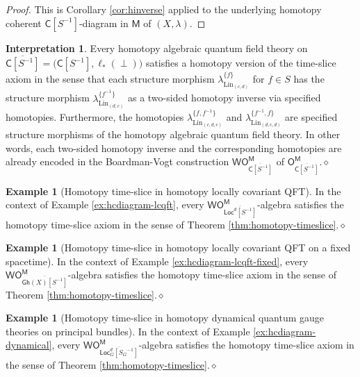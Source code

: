 \documentclass[11pt]{amsbook}
\numberwithin{section}{chapter}
\numberwithin{subsection}{section}
\numberwithin{equation}{section}
\theoremstyle{plain}
\theoremstyle{definition}
\newtheorem{example}[equation]{Example}
\newtheorem{interpretation}[equation]{Interpretation}
\newcommand{\Lin}{\mathrm{Lin}}
\newcommand{\C}{\mathsf{C}}
\newcommand{\M}{\mathsf{M}}
\renewcommand{\O}{\mathsf{O}}
\newcommand{\Otom}{\O^{\M}}
\newcommand{\W}{\mathsf{W}}
\newcommand{\dqed}{\hfill$\diamond$}
\newcommand{\inv}[1]{{#1}^{-1}}
\newcommand{\finverse}{\inv{f}}
\newcommand{\Sinv}{\inv{S}}
\newcommand{\Csinv}{\C[\inv{S}]}
\newcommand{\Csinvbar}{\overline{\Csinv}}
\newcommand{\Ocsinvbar}{\O_{\Csinvbar}}
\newcommand{\Ocsinvbarm}{\Ocsinvbar^{\M}}
\newcommand{\Bgloc}{\Locd_G}
\newcommand{\Bglocsginv}{\Bgloc[\inv{S_G}]}
\newcommand{\Bglocsginvbar}{\overline{\Bglocsginv}}
\newcommand{\Gh}{\mathsf{Gh}}
\newcommand{\Ghx}{\Gh(X)}
\newcommand{\Ghxsinvbar}{\overline{\Ghx[\Sinv]}}
\newcommand{\Loc}{\mathsf{Loc}}
\newcommand{\Locd}{\Loc^d}
\newcommand{\Locdsinv}{\Locd[\Sinv]}
\newcommand{\Locdsinvbar}{\overline{\Locdsinv}}
\newcommand{\wom}{\W\Otom}
\newcommand{\wocsinvbarm}{\W\Ocsinvbarm}
\begin{document}
\begin{proof}
This is Corollary \ref{cor:hinverse} applied to the underlying homotopy coherent $\Csinv$-diagram in $\M$ of $(X,\lambda)$.
\end{proof}

\begin{interpretation}
Every homotopy algebraic quantum field theory on $\Csinvbar=\bigl(\Csinv, \ell_*(\perp)\bigr)$ satisfies a homotopy version of the time-slice axiom in the sense that each structure morphism $\lambda_{\Lin_{(c,d)}}^{\{f\}}$ for $f \in S$ has the structure morphism $\lambda_{\Lin_{(d,c)}}^{\{\finverse\}}$ as a two-sided homotopy inverse via specified homotopies.  Furthermore, the homotopies $\lambda^{\{f,\finverse\}}_{\Lin_{(c,d,c)}}$ and $\lambda^{\{\finverse,f\}}_{\Lin_{(d,c,d)}}$ are specified structure morphisms of the homotopy algebraic quantum field theory.  In other words, each two-sided homotopy inverse and the corresponding homotopies are already encoded in the Boardman-Vogt construction $\wocsinvbarm$ of $\Ocsinvbarm$.\dqed
\end{interpretation}

\begin{example}[Homotopy time-slice in homotopy locally covariant QFT]\label{ex:hts-hlcqft}
In the context of Example \ref{ex:hcdiagram-lcqft}, every $\wom_{\Locdsinvbar}$-algebra satisfies the homotopy time-slice axiom in the sense of Theorem \ref{thm:homotopy-timeslice}.\dqed
\end{example}

\begin{example}[Homotopy time-slice in homotopy locally covariant QFT on a fixed spacetime]\label{ex:hts-hlcqft-fixed}
In the context of Example \ref{ex:hcdiagram-lcqft-fixed}, every  $\wom_{\Ghxsinvbar}$-algebra satisfies the homotopy time-slice axiom in the sense of Theorem \ref{thm:homotopy-timeslice}.\dqed
\end{example}

\begin{example}[Homotopy time-slice in homotopy dynamical quantum gauge theories on principal bundles]\label{ex:hts-bundle}
In the context of Example \ref{ex:hcdiagram-dynamical}, every  $\wom_{\Bglocsginvbar}$-algebra satisfies the homotopy time-slice axiom in the sense of Theorem \ref{thm:homotopy-timeslice}.\dqed
\end{example}
\end{document}
